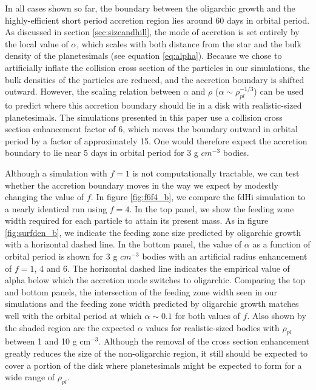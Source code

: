 \documentclass[twocolumn]{aastex63}
\begin{document}
In all cases shown so far, the boundary between the
oligarchic growth and the highly-efficient short period accretion
region lies around 60 days in orbital period. As discussed in section \ref{sec:sizeandhill}, the mode of accretion is
set entirely by the local value of $\alpha$, which scales with both
distance from the star and the bulk density of the planetesimals (see
equation \ref{eq:alpha}). Because we chose to artificially inflate the
collision cross section of the particles in our simulations, the bulk densities
of the particles are reduced, and the accretion boundary is shifted outward.
However,  the scaling relation between $\alpha$ and $\rho$ ($\alpha \sim \rho_{pl}^{-1/3}$) can be used
to predict where this accretion boundary should lie in a disk with realistic-sized planetesimals. The simulations
presented in this paper use a collision cross section enhancement factor of 6, which moves the boundary outward in orbital
period by a factor of approximately 15. One would therefore expect the accretion boundary to lie near 5 days in orbital period
for 3 g $cm^{-3}$ bodies.

Although a simulation with $f=1$ is not computationally tractable, we
can test whether the accretion boundary moves in the way we expect by
modestly changing the value of $f$. In figure \ref{fig:f6f4_b}, we
compare the fdHi simulation to a nearly identical run using $f=4$. In
the top panel, we show the feeding zone width required for each particle to
attain its present mass. As in figure \ref{fig:surfden_b}, we indicate the feeding
zone size predicted by oligarchic growth with a horizontal dashed line.  In the bottom panel, the value
of $\alpha$ as a function of orbital period is shown for 3 g $cm^{-3}$
bodies with an artificial radius enhancement of $f=1$, 4 and 6. The
horizontal dashed line indicates the empirical value of alpha below which the
accretion mode switches to oligarchic. Comparing the top and
bottom panels, the intersection of the feeding zone width seen in our simulations and the
feeding zone width predicted by oligarchic growth matches well with the orbital period at which $\alpha
\sim 0.1$ for both values of $f$.  Also shown by the shaded region are the expected $\alpha$ values for
realistic-sized bodies with $\rho_{pl}$ between 1 and 10 g cm$^{-3}$. Although the removal of the cross section
enhancement greatly reduces the size of the non-oligarchic region, it still should be expected to cover a portion of the
disk where planetesimals might be expected to form for a wide range of $\rho_{pl}$.
\end{document}
